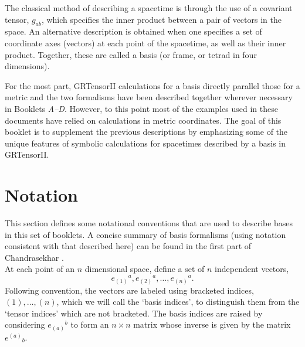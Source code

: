 \documentclass{article}
\begin{document}
\grlabel{\grBasisLabel}
\grtitle{\grBasisTitle}
\grtitlepage
\copyrightpage
\noindent The classical method of describing a spacetime is through
the use of a covariant tensor, $g_{ab}$, which specifies the inner
product between a pair of vectors in the space. An alternative
description is obtained when one specifies a set of coordinate axes
(vectors) at each point of the spacetime, as well as their inner
product. Together, these are called a basis (or frame, or tetrad in
four dimensions).

For the most part, GRTensorII calculations for a basis directly
parallel those for a metric and the two formalisms have been described
together wherever necessary in Booklets \textsl{A--D}. However, to
this point most of the examples used in these documents
have relied on calculations in metric coordinates. The goal
of this booklet is to supplement the previous descriptions by
emphasizing some of the unique features of symbolic calculations for
spacetimes described by a basis in GRTensorII.
%
\section{Notation}
%
This section defines some notational conventions that are used to
describe bases in this set of booklets. A concise summary of basis
formalisms (using notation consistent with that described here) can be
found in the first part of Chandrasekhar \cite{chandrasekhar:1983}.\\

At each point of an $n$ dimensional space, define a set of $n$
independent vectors,
\[
  e_{(1)}{}^a, e_{(2)}{}^a, \ldots, e_{(n)}{}{}^a.  
\]
Following convention, the vectors are labeled using bracketed
indices, $(1), \ldots, (n)$, which we will call the `basis indices',
to distinguish them from the `tensor indices' which are not bracketed.
The basis indices are raised by considering $e_{(a)}{}^b$ to form an
$n\times n$ matrix whose inverse is given by the matrix $e^{(a)}{}_b$.
\end{document}
